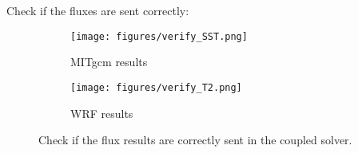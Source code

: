 
Check if the fluxes are sent correctly:

\begin{figure}[h!]
\centering
  \begin{subfigure}[b]{0.8\linewidth}
  \texttt{[image: figures/verify\_SST.png]}
  \caption{MITgcm results}
  \end{subfigure}
  \hspace{0.1 in}
  \begin{subfigure}[b]{0.8\linewidth}
  \texttt{[image: figures/verify\_T2.png]}
  \caption{WRF results}
  \end{subfigure}
\caption{Check if the flux results are correctly sent in the coupled solver.}
\label{fig:flux}
\end{figure}

